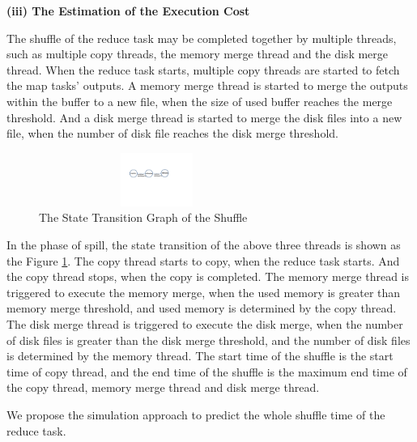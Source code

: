 \noindent\textbf{(iii) The Estimation of the Execution Cost}

The shuffle of the reduce task may be completed together by multiple threads, such as multiple copy threads, the memory merge thread and the disk merge thread. When the reduce task starts, multiple copy threads are started to fetch the map tasks' outputs. A memory merge thread is started to merge the outputs within the buffer to a new file, when the size of used buffer reaches the merge threshold. And a disk merge thread is started to merge the disk files into a new file, when the number of disk file reaches the disk merge threshold.	

\begin{figure}[htbp]
\centering
\includegraphics[height=1.75cm, width=7.7cm]{status}
\caption{The State Transition Graph of the Shuffle}
\label{fig:state}
\end{figure}

In the phase of spill, the state transition of the above three threads is shown as the Figure \ref{fig:state}.  The copy thread starts to copy, when the reduce task starts. And the copy thread stops, when the copy is completed. The memory merge thread is triggered to execute the memory merge, when the used memory is greater than memory merge threshold, and used memory is determined by the copy thread. The disk merge thread is triggered to execute the disk merge, when the number of disk files is greater than the disk merge threshold, and the number of disk files is determined by the memory thread. The start time of the shuffle is the start time of copy thread, and the end time of the shuffle is the maximum end time of the copy thread, memory merge thread and disk merge thread.


We propose the simulation approach to predict the whole shuffle time of the reduce task. 

